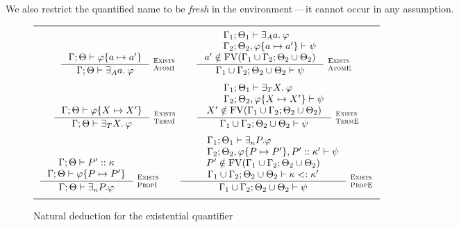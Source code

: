 \documentclass[english, mgr]{iithesis}
\renewcommand{\it}[1]{\textit{#1}}
\newcommand{\scbrk}[2]{\myatop{\textsc{#1}}{\textsc{#2}}}
\newcommand{\mdash}{\,---\,}
\def\-{{\mdash}}
\begin{document}
We also restrict the quantified name to be \it{fresh} in the environment\-it cannot occur in any assumption.
\begin{figure}[htbp]
  \centering
  \begin{tabularx}{\textwidth}{|C|}
  \hline \\ $
  \inference{
    \jgmnt[\cEnv;\Theta]{\formphi \{\atomv \mapsto \atomv'\}}
    }{
    \jgmnt[\cEnv;\Theta]{\fExistsAtom{\atomv}\formphi}
  }\:\scbrk{Exists}{AtomI}
  \qquad
  \inference{
    \qquad \jgmnt[\cEnv_1;\Theta_1]{\fExistsAtom{\atomv}\formphi} \hfill \\
    \qquad \jgmnt[\cEnv_2;\Theta_2,\formphi \{\atomv \mapsto \atomv'\}]{\psi} \hfill \\
    \atomv' \notin \fv[\cEnv_1 \cup \cEnv_2;\Theta_2 \cup \Theta_2]
    }{
    \jgmnt[\cEnv_1 \cup \cEnv_2;\Theta_2 \cup \Theta_2]{\psi}
  }\:\scbrk{Exists}{AtomE}
  $ \\ \\ $
  \inference{
    \jgmnt[\cEnv;\Theta]{\formphi \{\termv \mapsto \termv'\}}
    }{
    \jgmnt[\cEnv;\Theta]{\fExistsTerm{\termv}\formphi}
  }\:\scbrk{Exists}{TermI}
  \qquad
  \inference{
    \qquad \jgmnt[\cEnv_1;\Theta_1]{\fExistsTerm{\termv}\formphi} \hfill \\
    \qquad \jgmnt[\cEnv_2;\Theta_2,\formphi \{\termv \mapsto \termv'\}]{\psi} \hfill \\
    \termv' \notin \fv[\cEnv_1 \cup \cEnv_2;\Theta_2 \cup \Theta_2]
    }{
    \jgmnt[\cEnv_1 \cup \cEnv_2;\Theta_2 \cup \Theta_2]{\psi}
  }\:\scbrk{Exists}{TermE}
  $ \\ \\ $
  \inference{
    \jgmnt[\cEnv;\Theta]{\propv' \ofkind \kind}
    \\
    \jgmnt[\cEnv;\Theta]{\formphi \{\propv \mapsto \propv'\}}
    }{
    \jgmnt[\cEnv;\Theta]{\fExistsProp{\propv}{\kind}\formphi}
  }\:\scbrk{Exists}{PropI}
  \qquad
  \inference{
    \qquad \jgmnt[\cEnv_1;\Theta_1]{\fExistsProp{\propv}{\kind}\formphi} \hfill \\
    \qquad \jgmnt[\cEnv_2;\Theta_2,\formphi \{\propv \mapsto \propv'\}, \propv' \ofkind \kind']{\psi} \hfill \\
    \propv' \notin \fv[\cEnv_1 \cup \cEnv_2;\Theta_2 \cup \Theta_2] \\
    \jgmnt[\cEnv_1 \cup \cEnv_2;\Theta_2 \cup \Theta_2]{\kind \subkind \kind'}
  }{
      \jgmnt[\cEnv_1 \cup \cEnv_2;\Theta_2 \cup \Theta_2]{\psi}
  }\:\scbrk{Exists}{PropE}
  $ \\ \\ \hline
  \end{tabularx}
  \caption{Natural deduction for the existential quantifier}
  \label{fig:quantifiers}
\end{figure}
\end{document}
